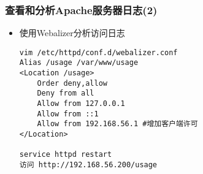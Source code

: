 \documentclass[xcolor=svgnames,presentation]{beamer}
\begin{document}
\begin{frame}[fragile]
\frametitle{查看和分析Apache服务器日志(2)}
\label{sec-5-4}
\begin{itemize}

\item 使用Webalizer分析访问日志\\
\label{sec-5-4-1}%
\begin{verbatim}
vim /etc/httpd/conf.d/webalizer.conf
Alias /usage /var/www/usage
<Location /usage>
    Order deny,allow
    Deny from all
    Allow from 127.0.0.1
    Allow from ::1
    Allow from 192.168.56.1 #增加客户端许可
</Location>

service httpd restart
访问 http://192.168.56.200/usage
\end{verbatim}
\end{itemize} %
\end{frame}
\end{document}
